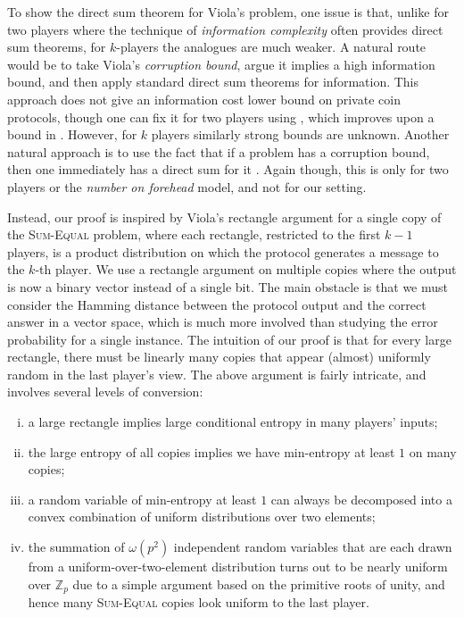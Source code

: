 \documentclass[11pt]{article}
\numberwithin{equation}{section}
\theoremstyle{definition}
\theoremstyle{plain}
\newcommand{\Z}{\mathbb Z}
\newcommand{\sumequal}{\textsc{Sum-Equal} }
\begin{document}
To show the direct sum theorem for Viola's problem, 
one issue is that, unlike for two players where the technique
of \emph{information
complexity} often provides direct sum theorems, 
for $k$-players the analogues are much weaker. A natural route would be
to take Viola's \emph{corruption bound}, argue it implies a high
information bound, and then apply standard direct sum theorems for
information. This approach does not give an information cost lower
bound on private coin protocols, though one can fix it for two players
using \cite{bg14}, which improves upon a bound in \cite{BBKLSV16}.
However, for $k$ players similarly strong
bounds are unknown. 
Another natural approach is to use the fact
that if a problem has a corruption bound, then one immediately has 
a direct sum for it \cite{BPSW05}. Again though, this is only for two players or
the \emph{number on forehead} model, and not for 
our setting. 

Instead, our proof is inspired by Viola's rectangle argument 
for a single copy of the \sumequal problem, 
where each rectangle, restricted to the first
$k-1$ players, is a product distribution on 
which the protocol generates a message to the $k$-th player. 
We use a rectangle argument on multiple copies where the output 
is now a binary vector instead of a single bit.
The main obstacle is that we must consider the Hamming distance between the protocol output and the correct answer in a vector space,
which is much more involved than studying the error probability for a 
single instance.
The intuition of our proof is that for every large rectangle,
there must be linearly many copies that appear (almost) uniformly 
random in the last player's view.
The above argument is fairly intricate, and involves several levels of 
conversion:
%
%
\begin{enumerate}[(i)]  %
\item a large rectangle implies large conditional entropy in many players' inputs;
\item the large entropy of all copies implies we have min-entropy at least $1$ on many copies;
\item a random variable of min-entropy at least $1$ can always be  decomposed into a convex combination of uniform distributions over two elements;
\item the summation {\color{black} of $\omega(p^2)$} independent random variables that are each drawn from a uniform-over-two-element distribution turns out to be nearly uniform {\color{black} over $\Z_p$ due to a simple argument based on the primitive roots of unity},
and hence many \sumequal copies look uniform to the last player.
\end{enumerate}
%
%
\end{document}
